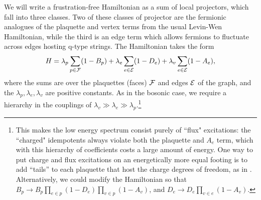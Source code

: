 We will write a frustration-free Hamiltonian as a sum of local projectors, which fall into
three classes.
Two of these classes of projector are the fermionic analogues of the plaquette and vertex terms from the usual Levin-Wen Hamiltonian, 
while the third is an edge term which allows fermions to fluctuate across edges hosting q-type strings.
The Hamiltonian takes the form
\begin{align} \label{ham}
H = \lambda_p \sum_{p \in \mathcal{F}} (1-B_p) + \lambda_e \sum_{e \in \mathcal{E}} (1-D_e) + \lambda_v \sum_{e \in \mathcal{E}} (1-A_e),
\end{align}
where the sums are over the plaquettes (faces) $\mathcal{F}$ and edges $\mathcal{E}$ of the graph, 
and the $\lambda_p,\lambda_e,\lambda_v$ are positive constants.
As in the bosonic case, we require a hierarchy in the couplings of $\lambda_v \gg \lambda_e \gg \lambda_p$.\footnote{
This makes the low energy spectrum consist purely of ``flux" excitations: 
the ``charged" idempotents always violate both the plaquette and $A_e$ term, which with this hierarchy of coefficients costs a large amount of energy. 
One way to put charge and flux excitations on an energetically more equal footing is to add ``tails'' to each 
plaquette that host the charge degrees of freedom, as in \cite{Hu2015}.
Alternatively, we could modify the Hamiltonian so that $B_p \rightarrow B_p \prod_{e \in p} (1-D_e) \prod_{v \in p} (1-A_v)$, and $D_e \rightarrow D_e \prod_{v \in e} (1-A_v)$.
}
